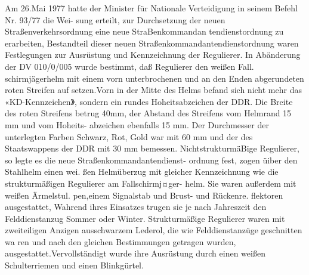 

Am 26.Mai 1977 hatte der Minister für Nationale
Verteidigung in seinem Befehl Nr. 93/77 die Wei-
sung erteilt, zur Durchsetzung der neuen Straßenverkehrsordnung eine neue StraBenkommandan
tendienstordnung zu erarbeiten, Bestandteil dieser
neuen Straßenkommandantendienstordnung waren
Festlegungen zur Ausrüstung und Kennzeichnung
der Regulierer. In Abänderung der DV 010/0/005
wurde bestimmt, daß Regulierer den weißen Fall.
schirmjägerhelm mit einem vorn unterbrochenen
und an den Enden abgerundeten roten Streifen auf
setzen.Vorn in der Mitte des Helms befand sich
nicht mehr das «KD-Kennzeichen》, sondern ein
rundes Hoheitsabzeichen der DDR. Die Breite des
roten Streifens betrug 40mm, der Abstand des
Streifens vom Helmrand 15 mm und vom Hoheits-
abzeichen ebenfalls 15 mm. Der Durchmesser der
unterlegten Farben Schwarz, Rot, Gold war mit
60 mm und der des Staatswappens der DDR mit
30 mm bemessen. NichtstrukturmäBige Regulierer,
so legte es die neue Straßenkommandantendienst-
ordnung fest, zogen üiber den Stahlhelm einen wei.
ßen Helmüberzug mit gleicher Kennzeichnung wie
die strukturmäßigen Regulierer am Fallschirmj¤ger-
helm. Sie waren außerdem mit weißen Ärmelstul.
pen,einem Signalstab und Brust- und Rückenre.
flektoren ausgestattet, Wahrend ihres Einsatzes
trugen sie je nach Jahreszeit den Felddienstanzug
Sommer oder Winter. Strukturmäßige Regulierer
waren mit zweiteiligen Anzigen ausschwarzem
Lederol, die wie Felddienstanzüge geschnitten wa
ren und nach den gleichen Bestimmungen getragen
wurden, ausgestattet.Vervollständigt wurde ihre
Ausrüstung durch einen weißen Schulterriemen
und einen Blinkgürtel.